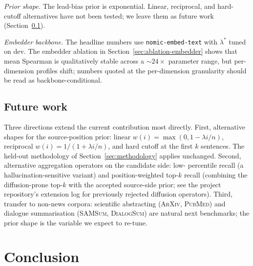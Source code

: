 \documentclass[journal]{IEEEtran}
\begin{document}
\textit{Prior shape.} The lead-bias prior is exponential. Linear,
reciprocal, and hard-cutoff alternatives have not been tested;
we leave them as future work (Section~\ref{sec:future-work}).

\textit{Embedder backbone.} The headline numbers use
\texttt{nomic-embed-text} with $\lambda^*$ tuned on dev. The
embedder ablation in Section~\ref{sec:ablation-embedder} shows
that mean Spearman is qualitatively stable across a $\sim24\times$
parameter range, but per-dimension profiles shift; numbers
quoted at the per-dimension granularity should be read as
backbone-conditional.

\subsection{Future work}
\label{sec:future-work}
Three directions extend the current contribution most directly.
First, alternative shapes for the source-position prior: linear
$w(i)=\max(0, 1-\lambda i/n)$, reciprocal
$w(i)=1/(1+\lambda i/n)$, and hard cutoff at the first $k$
sentences. The held-out methodology of
Section~\ref{sec:methodology} applies unchanged. Second,
alternative aggregation operators on the candidate side: low-
percentile recall (a hallucination-sensitive variant) and
position-weighted top-$k$ recall (combining the diffusion-prone
top-$k$ with the accepted source-side prior; see the project
repository's extension log for previously rejected diffusion
operators). Third, transfer to non-news corpora: scientific
abstracting (\textsc{ArXiv}, \textsc{PubMed}) and dialogue
summarisation (\textsc{SAMSum}, \textsc{DialogSum}) are natural
next benchmarks; the prior shape is the variable we expect to
re-tune.

\section{Conclusion}
\label{sec:conclusion}
\end{document}
